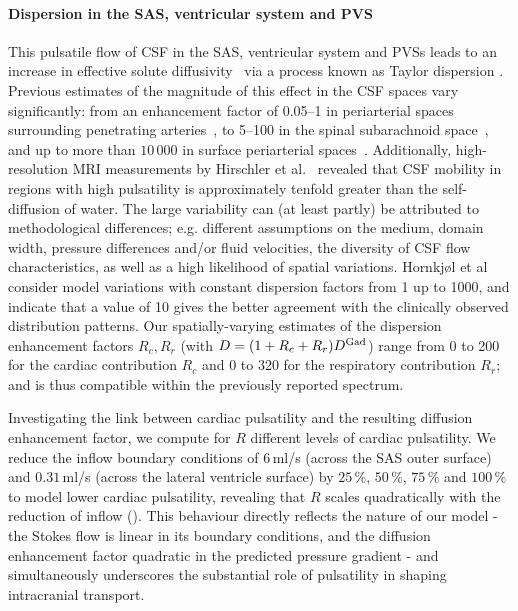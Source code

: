 \documentclass[fleqn,10pt]{wlscirep}
\begin{document}
\paragraph{Dispersion in the SAS, ventricular system and PVS}
This pulsatile flow of CSF in the SAS, ventricular system and PVSs
leads to an increase in effective solute
diffusivity~\cite{stockman2007effect, hettiarachchi2011effect,
  asgari2016glymphatic, sharp2019dispersion, ray2021quantitative} via
a process known as Taylor dispersion \cite{taylor1953dispersion,
  watson1983diffusion}. Previous estimates of the magnitude of this
effect in the CSF spaces vary significantly: from an enhancement
factor of 0.05--1 in periarterial spaces surrounding penetrating
arteries~\cite{asgari2016glymphatic, troyetsky2021dispersion}, to
5--100 in the spinal subarachnoid space~\cite{stockman2007effect,
  hettiarachchi2011effect, sharp2019dispersion}, and up to more than
$10\,000$ in surface periarterial spaces~\cite{ray2021quantitative,
  sharp2019dispersion}.
Additionally, high-resolution MRI measurements by Hirschler et al.~\cite{hirschler2024region} revealed that CSF mobility in regions with high pulsatility is approximately tenfold greater than the self-diffusion of water.
The large variability can (at least partly) be
attributed to methodological differences; e.g. different assumptions
on the medium, domain width, pressure differences and/or fluid
velocities, the diversity of CSF flow characteristics, as well as a
high likelihood of spatial variations. Hornkjøl et
al~\cite{hornkjol2022csf} consider model variations with constant
dispersion factors from 1 up to 1000, and indicate that a value of 10
gives the better agreement with the clinically observed
distribution patterns. Our spatially-varying estimates of the dispersion
enhancement factors $R_c, R_r$ (with $D = (1 + R_c + R_r) D^{\rm
  Gad}$) range from 0 to 200 for the cardiac contribution $R_c$ and 0
to 320 for the respiratory contribution $R_r$; and is thus compatible
within the previously reported spectrum. 

Investigating the link between cardiac pulsatility and the resulting diffusion enhancement factor, we compute for $R$ different levels of cardiac pulsatility. We reduce the inflow boundary conditions of $6\,$ml/s (across the SAS outer surface) and $0.31\,$ml/s (across the lateral ventricle surface) by $25\,\%$, $50\,\%$, $75\,\%$ and $100\,\%$ to model lower cardiac pulsatility, revealing that $R$ scales quadratically with the reduction of inflow (). This behaviour directly reflects the nature of our model - the Stokes flow is linear in its boundary conditions, and the diffusion enhancement factor quadratic in the predicted pressure gradient - and simultaneously underscores the substantial role of pulsatility in shaping intracranial transport. 
\end{document}

